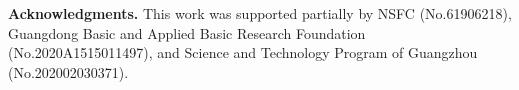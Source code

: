 \documentclass[runningheads]{utils/llncs}
\begin{document}
\noindent\textbf{Acknowledgments.} This work was supported partially by NSFC (No.61906218), Guangdong Basic and Applied Basic Research Foundation (No.2020A1515011497), and Science and Technology Program of Guangzhou (No.202002030371). 

\clearpage


\end{document}
